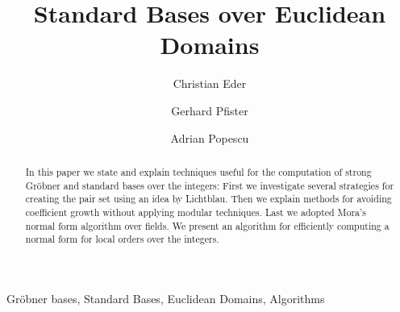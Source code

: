 \documentclass[final,1p,times,authoryear]{elsarticle}
\begin{document}
\begin{frontmatter}

\title{Standard Bases over Euclidean Domains}

\author{Christian Eder}
\address{TU Kaiserslautern\\Department of Mathematics\\D-67663 Kaiserslautern}

\author{Gerhard Pfister}
\address{TU Kaiserslautern\\Department of Mathematics\\D-67663 Kaiserslautern}

\author{Adrian Popescu}
\address{TU Kaiserslautern\\Department of Mathematics\\D-67663 Kaiserslautern}

\begin{abstract}
In this paper we state and explain techniques useful for the computation of
strong Gr\"obner and standard bases over the integers: First we investigate
several strategies for creating the pair set using an idea by Lichtblau.
Then we explain methods for avoiding coefficient growth without applying
modular techniques. Last we adopted Mora's normal form algorithm over fields.
We present an algorithm for efficiently computing a normal form for local orders
over the integers.
\end{abstract}

\begin{keyword}
Gr\"obner bases, Standard Bases, Euclidean Domains, Algorithms
\end{keyword}
\end{frontmatter}

%
\end{document}
